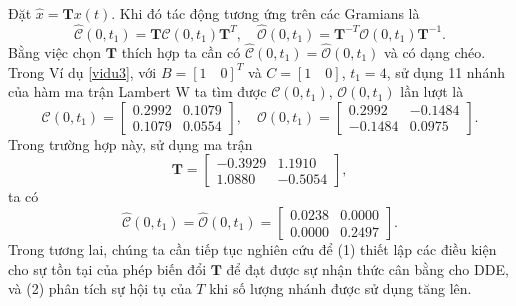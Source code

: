 Đặt $\hat{x}=\mathbf{T} x(t)$. Khi đó tác động tương ứng trên các Gramians là
%
\begin{equation}\label{t21}
\hat{\mathcal{C}}(0,t_1)=\mathbf{T}\mathcal{C}(0,t_1)\mathbf{T}^T, \quad\hat{\mathcal{O}}(0,t_1)=\mathbf{T}^{-T}\mathcal{O}(0,t_1)\mathbf{T}^{-1}.
\end{equation}
%
Bằng việc chọn $\mathbf{T}$ thích hợp ta cần có $\hat{\mathcal{C}}(0,t_1) = \hat{\mathcal{O}}(0,t_1)$ và có dạng chéo. Trong Ví dụ \ref{vidu3}, với $B=[1\quad 0]^T$ và $C=[1\quad 0]$, $t_1=4$, sử dụng 11 nhánh của hàm ma trận Lambert W ta tìm được $\mathcal{C}(0, t_1)$, $\mathcal{O}(0,t_1 )$ lần lượt là
\begin{equation}\label{t22}
\mathcal{C}(0, t_1)=\begin{bmatrix}
0.2992 & 0.1079\\
0.1079 & 0.0554
\end{bmatrix}, \quad 
\mathcal{O}(0, t_1)=\begin{bmatrix}
0.2992 & -0.1484\\
-0.1484 & 0.0975
\end{bmatrix}. 
\end{equation}      
%
Trong trường hợp này, sử dụng ma trận
\begin{equation}\label{t23}
\mathbf{T} = \begin{bmatrix}
-0.3929 & 1.1910\\
1.0880 & -0.5054
\end{bmatrix},
\end{equation}
ta có
\begin{equation}\label{t24}
\hat{\mathcal{C}}(0,t_1)=\hat{\mathcal{O}}(0,t_1)=\begin{bmatrix}
0.0238 & 0.0000\\
0.0000 & 0.2497
\end{bmatrix}.
\end{equation}
%
Trong tương lai, chúng ta cần tiếp tục nghiên cứu để (1) thiết lập các điều kiện cho sự tồn tại của phép biến đổi $\mathbf{T}$ để đạt được sự nhận thức cân bằng cho DDE, và (2) phân tích sự hội tụ của $T$ khi số lượng nhánh được sử dụng tăng lên.  

